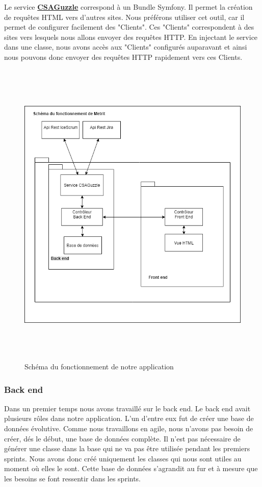 \documentclass[12pt, twoside, openright]{report}
\begin{document}
Le service \href{https://github.com/csarrazi/CsaGuzzleBundle}{\textbf{CSAGuzzle}} correspond à un Bundle Symfony. Il permet la création de requêtes HTML vers d'autres sites. Nous préférons utiliser cet outil, car il permet de configurer facilement des "Clients". Ces "Clients" correspondent à des sites vers lesquels nous allons envoyer des requêtes HTTP. En injectant le service dans une classe, nous avons accès aux "Clients" configurés auparavant et ainsi nous pouvons donc envoyer des requêtes HTTP rapidement vers ces Clients.

\begin{figure}[h]
\centering
\includegraphics[width=15cm,height=15cm]{img/Metrit.png}
\caption{Schéma du fonctionnement de notre application}
\end{figure}

\subsubsection{Back end}

Dans un premier temps nous avons travaillé sur le back end. Le back end avait plusieurs rôles dans notre application. L'un d'entre eux fut de créer une base de données évolutive. Comme nous travaillons en agile, nous n'avons pas besoin de créer, dés le début, une base de données complète. Il n'est pas nécessaire de générer une classe dans la base qui ne va pas être utilisée pendant les premiers sprints. Nous avons donc créé uniquement les classes qui nous sont utiles au moment où elles le sont. Cette base de données s’agrandit au fur et à mesure que les besoins se font ressentir dans les sprints. 
\end{document}
